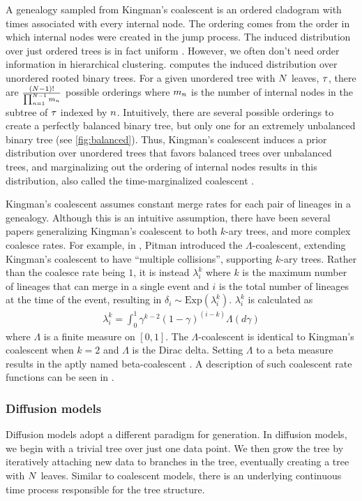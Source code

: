 A genealogy sampled from Kingman's coalescent
is an ordered cladogram with times associated with every internal node.
The ordering comes from the order in which
internal nodes were created in the jump process.
The induced distribution over just ordered trees
is in fact uniform \citep{Teh2008}.
However, we often don't need order information
in hierarchical clustering.
\citet{Boyles2012} computes the induced distribution over
unordered rooted binary trees.
For a given unordered tree with $N$ leaves, $\tau$,
there are $\frac{(N - 1)!}{\prod_{n = 1}^{N - 1}m_n}$ possible orderings
where $m_n$ is the number of internal nodes in the subtree
of $\tau$ indexed by $n$. 
Intuitively, there
are several possible orderings to create a perfectly balanced binary tree,
but only one for an extremely unbalanced binary tree (see \autoref{fig:balanced}).
Thus, Kingman's coalescent induces a prior distribution
over unordered trees
that favors balanced trees over unbalanced trees,
and 
marginalizing out the ordering of internal
nodes results in this distribution, also called
the time-marginalized coalescent \citep[TMC; ][]{Boyles2012}.

Kingman's coalescent assumes constant merge rates
for each pair of lineages in a genealogy. 
Although this is an intuitive assumption,
there have been several papers generalizing Kingman's coalescent
to both $k$-ary trees, and more complex coalesce rates.
For example, in \citet{Pitman1999}, Pitman introduced the
$\Lambda$-coalescent, extending Kingman's coalescent
to have ``multiple collisions'', supporting
$k$-ary trees.
Rather than the coalesce rate
being $1$, it is instead $\lambda_i^k$
where $k$ is the maximum number of lineages
that can merge in a single event and $i$ is the total number
of lineages at the time of the event, resulting in $\delta_i \sim \text{Exp}(\lambda_i^k)$. $\lambda_i^k$ is calculated as
\begin{align}
  \lambda_i^k = \int_0^1 \gamma^{k - 2}(1 - \gamma)^{(i-k)}\Lambda(d\gamma)
\end{align}
where $\Lambda$ is a finite measure on $[0, 1]$. The
$\Lambda$-coalescent is identical to Kingman's coalescent
when $k = 2$ and $\Lambda$ is the Dirac delta.
Setting $\Lambda$ to a beta measure
results in the aptly named beta-coalescent \citep{Hu2013}.
A description of such coalescent rate functions
can be seen in \citet{Aldous1999}.

\subsubsection*{Diffusion models}
Diffusion models adopt a different paradigm for generation.
In diffusion models, we begin with a
trivial tree over just one data point. We then
grow the tree by iteratively attaching new data
to branches in the tree, eventually creating
a tree with $N$ leaves.
Similar to coalescent models, there is an underlying
continuous time process responsible for
the tree structure.

